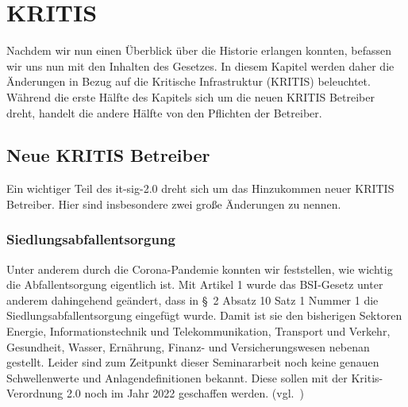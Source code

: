 \chapter{KRITIS}\label{ch:kritis}
Nachdem wir nun einen Überblick über die Historie erlangen konnten,
befassen wir uns nun mit den Inhalten des Gesetzes.
In diesem Kapitel werden daher die Änderungen in Bezug auf die Kritische Infrastruktur (KRITIS) beleuchtet.
Während die erste Hälfte des Kapitels sich um die neuen KRITIS Betreiber dreht,
handelt die andere Hälfte von den Pflichten der Betreiber.

\section{Neue KRITIS Betreiber}\label{sec:neue-kritis-betreiber}
Ein wichtiger Teil des \acrshort{it-sig-2.0} dreht sich um das Hinzukommen neuer KRITIS Betreiber.
Hier sind insbesondere zwei große Änderungen zu nennen.

\subsection{Siedlungsabfallentsorgung}\label{ssec:siedlungsabfallentsorgung}
Unter anderem durch die Corona-Pandemie konnten wir feststellen, wie wichtig die Abfallentsorgung eigentlich ist.
Mit Artikel 1 wurde das BSI-Gesetz unter anderem dahingehend geändert,
dass in §~2 Absatz 10 Satz 1 Nummer 1 die Siedlungsabfallentsorgung eingefügt wurde.
Damit ist sie den bisherigen Sektoren Energie, Informationstechnik und Telekommunikation,
Transport und Verkehr, Gesundheit, Wasser, Ernährung, Finanz- und Versicherungswesen nebenan gestellt.
Leider sind zum Zeitpunkt dieser Seminararbeit noch keine genauen Schwellenwerte und Anlagendefinitionen bekannt.
Diese sollen mit der Kritis-Verordnung 2.0 noch im Jahr 2022 geschaffen werden.
(vgl.~\cite{neue-it-sig-2.0})

